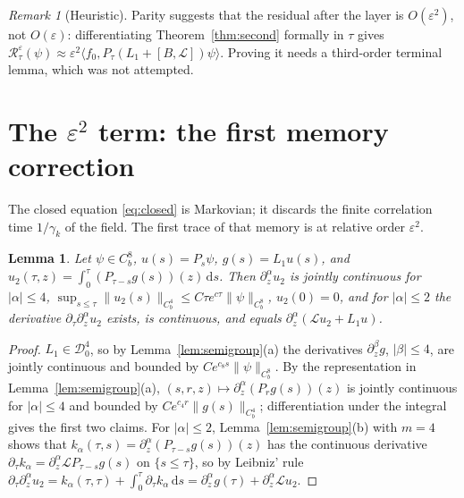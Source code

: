 \documentclass[11pt]{article}
\newcommand{\dd}{\mathrm{d}}
\newcommand{\eps}{\varepsilon}
\newcommand{\cL}{\mathcal{L}}
\newcommand{\cD}{\mathcal{D}}
\newcommand{\cR}{\mathcal{R}}
\newcommand{\nrm}[2]{\|#1\|_{#2}}
\newtheorem{lemma}[theorem]{Lemma}
\theoremstyle{remark}
\newtheorem{remark}[theorem]{Remark}
\begin{document}
\begin{remark}[Heuristic]
Parity suggests that the residual after the layer is $O(\eps^2)$, not
$O(\eps)$: differentiating Theorem~\ref{thm:second} formally in $\tau$
gives $\cR^\eps_\tau(\psi)\approx\eps^2\langle f_0,P_\tau(L_1+[B,\cL])
\psi\rangle$. Proving it needs a third-order terminal lemma, which was not
attempted.
\end{remark}

\section{The $\eps^2$ term: the first memory correction}

The closed equation \eqref{eq:closed} is Markovian; it discards the finite
correlation time $1/\gamma_k$ of the field. The first trace of that memory
is at relative order $\eps^2$.

\begin{lemma}\label{lem:u2}
Let $\psi\in C_b^8$, $u(s)=P_s\psi$, $g(s)=L_1u(s)$, and
$u_2(\tau,z)=\int_0^\tau(P_{\tau-s}g(s))(z)\,\dd s$. Then
$\partial_z^\alpha u_2$ is jointly continuous for $|\alpha|\le4$,
$\sup_{s\le\tau}\nrm{u_2(s)}{C_b^4}\le C\tau e^{c\tau}\nrm{\psi}{C_b^8}$,
$u_2(0)=0$, and for $|\alpha|\le2$ the derivative
$\partial_\tau\partial_z^\alpha u_2$ exists, is continuous, and equals
$\partial_z^\alpha(\cL u_2+L_1u)$.
\end{lemma}

\begin{proof}
$L_1\in\cD_0^4$, so by Lemma~\ref{lem:semigroup}(a) the derivatives
$\partial_z^\beta g$, $|\beta|\le4$, are jointly continuous and bounded by
$Ce^{c_8s}\nrm{\psi}{C_b^8}$. By the representation in
Lemma~\ref{lem:semigroup}(a), $(s,r,z)\mapsto\partial_z^\alpha(P_rg(s))(z)$
is jointly continuous for $|\alpha|\le4$ and bounded by
$Ce^{c_4r}\nrm{g(s)}{C_b^4}$; differentiation under the integral gives the
first two claims. For $|\alpha|\le2$, Lemma~\ref{lem:semigroup}(b) with
$m=4$ shows that $k_\alpha(\tau,s)=\partial_z^\alpha(P_{\tau-s}g(s))(z)$ has
the continuous derivative $\partial_\tau k_\alpha=\partial_z^\alpha
\cL P_{\tau-s}g(s)$ on $\{s\le\tau\}$, so by Leibniz' rule
$\partial_\tau\partial_z^\alpha u_2=k_\alpha(\tau,\tau)+\int_0^\tau
\partial_\tau k_\alpha\,\dd s=\partial_z^\alpha g(\tau)+\partial_z^\alpha
\cL u_2$.
\end{proof}
\end{document}
